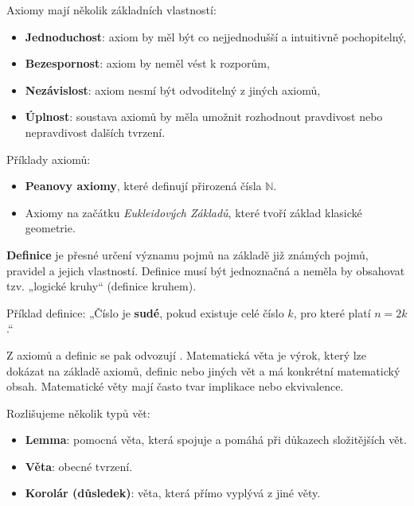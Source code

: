 \documentclass[12pt,a4paper]{article}
\begin{document}
Axiomy mají několik základních vlastností:
\begin{itemize}
    \item \textbf{Jednoduchost}: axiom by měl být co nejjednodušší a intuitivně pochopitelný,  
    \item \textbf{Bezespornost}: axiom by neměl vést k rozporům,  
    \item \textbf{Nezávislost}: axiom nesmí být odvoditelný z jiných axiomů,  
    \item \textbf{Úplnost}: soustava axiomů by měla umožnit rozhodnout pravdivost nebo nepravdivost dalších tvrzení.
\end{itemize}

\begin{examplebox}
Příklady axiomů:
\begin{itemize}
    \item \textbf{Peanovy axiomy}, které definují přirozená čísla $\mathbb{N}$.  
    \item Axiomy na začátku \textit{Eukleidových Základů}, které tvoří základ klasické geometrie.
\end{itemize}
\end{examplebox}

\begin{definitionbox}
\textbf{Definice} je přesné určení významu pojmů na základě již známých pojmů, pravidel a jejich vlastností.  
Definice musí být jednoznačná a neměla by obsahovat tzv. „logické kruhy“ (definice kruhem).  
\end{definitionbox}

\begin{examplebox}
Příklad definice:  
„Číslo je \textbf{sudé}, pokud existuje celé číslo $k$, pro které platí $n = 2k$.“
\end{examplebox}

Z axiomů a definic se pak odvozují .  
Matematická věta je výrok, který lze dokázat na základě axiomů, definic nebo jiných vět a má konkrétní matematický obsah.  
Matematické věty mají často tvar implikace nebo ekvivalence.  

Rozlišujeme několik typů vět:
\begin{itemize}
    \item \textbf{Lemma}: pomocná věta, která spojuje a pomáhá při důkazech složitějších vět.  
    \item \textbf{Věta}: obecné tvrzení.  
    \item \textbf{Koro­lár (důsledek)}: věta, která přímo vyplývá z jiné věty.
\end{itemize}
\end{document}
